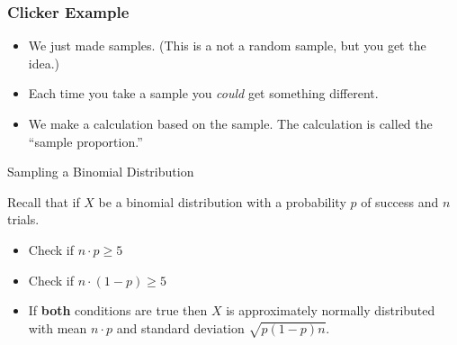 \begin{frame}
  \frametitle{Clicker Example}

  \begin{itemize}
  \item We just made samples. (This is a not a random sample, but you
    get the idea.)

  \item Each time you take a sample you \textit{could} get something
    different.

  \item We make a calculation based on the sample. The calculation is
    called the ``sample proportion.''


  \end{itemize}

  \vfill


\end{frame}

\begin{frame}{Sampling a Binomial Distribution}

  Recall that if $X$ be a binomial distribution with a probability $p$
  of success and $n$ trials.
  \begin{itemize}
  \item Check if $n\cdot p \geq 5$ 
  \item Check if $n\cdot (1-p) \geq 5$ 
  \item If \textbf{both} conditions are true then $X$ is approximately
    normally distributed with mean $n\cdot p$ and standard deviation
    $\sqrt{p(1-p)n}$.
  \end{itemize}

  
\end{frame}


